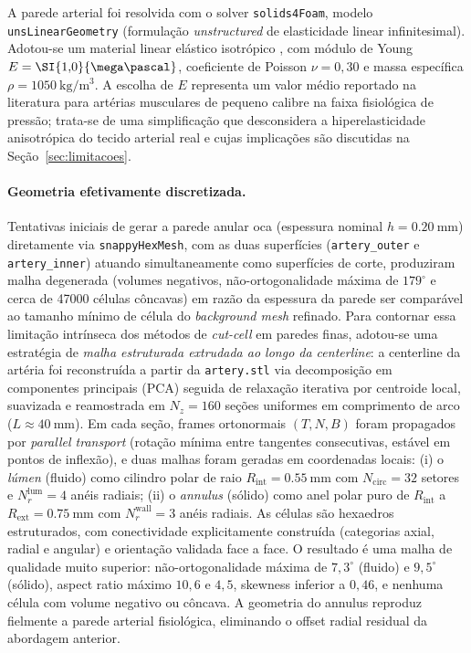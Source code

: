 A parede arterial foi resolvida com o solver \texttt{solids4Foam}, modelo
\texttt{unsLinearGeometry} (formulação \emph{unstructured} de elasticidade
linear infinitesimal). Adotou-se um material linear elástico isotrópico
\citep{Holzapfel2000}, com módulo de Young \(E = \SI{1{,}0}{\mega\pascal}\),
coeficiente de Poisson \(\nu = 0{,}30\) e massa específica
\(\rho = \SI{1050}{\kilogram\per\meter\cubed}\). A escolha de \(E\) representa
um valor médio reportado na literatura para artérias musculares de pequeno
calibre na faixa fisiológica de pressão; trata-se de uma simplificação que
desconsidera a hiperelasticidade anisotrópica do tecido arterial real e cujas
implicações são discutidas na Seção~\ref{sec:limitacoes}.

\paragraph{Geometria efetivamente discretizada.}
Tentativas iniciais de gerar a parede anular oca (espessura nominal \(h = \SI{0,20}{\milli\meter}\)) diretamente via \texttt{snappyHexMesh}, com as duas superfícies (\texttt{artery\_outer} e \texttt{artery\_inner}) atuando simultaneamente como superfícies de corte, produziram malha degenerada (volumes negativos, não-ortogonalidade máxima de \(179^{\circ}\) e cerca de \num{47000} células côncavas) em razão da espessura da parede ser comparável ao tamanho mínimo de célula do \emph{background mesh} refinado. Para contornar essa limitação intrínseca dos métodos de \emph{cut-cell} em paredes finas, adotou-se uma estratégia de \emph{malha estruturada extrudada ao longo da centerline}: a centerline da artéria foi reconstruída a partir da \texttt{artery.stl} via decomposição em componentes principais (PCA) seguida de relaxação iterativa por centroide local, suavizada e reamostrada em \(N_z = 160\) seções uniformes em comprimento de arco (\(L \approx \SI{40}{\milli\meter}\)). Em cada seção, frames ortonormais \((T,N,B)\) foram propagados por \emph{parallel transport} (rotação mínima entre tangentes consecutivas, estável em pontos de inflexão), e duas malhas foram geradas em coordenadas locais: (i) o \emph{lúmen} (fluido) como cilindro polar de raio \(R_{\mathrm{int}} = \SI{0,55}{\milli\meter}\) com \(N_{\mathrm{circ}} = 32\) setores e \(N_{r}^{\mathrm{lum}} = 4\) anéis radiais; (ii) o \emph{annulus} (sólido) como anel polar puro de \(R_{\mathrm{int}}\) a \(R_{\mathrm{ext}} = \SI{0,75}{\milli\meter}\) com \(N_{r}^{\mathrm{wall}} = 3\) anéis radiais. As células são hexaedros estruturados, com conectividade explicitamente construída (categorias axial, radial e angular) e orientação validada face a face. O resultado é uma malha de qualidade muito superior: não-ortogonalidade máxima de \(7,3^{\circ}\) (fluido) e \(9,5^{\circ}\) (sólido), aspect ratio máximo \(10,6\) e \(4,5\), skewness inferior a \(0,46\), e nenhuma célula com volume negativo ou côncava. A geometria do annulus reproduz fielmente a parede arterial fisiológica, eliminando o offset radial residual da abordagem anterior.

